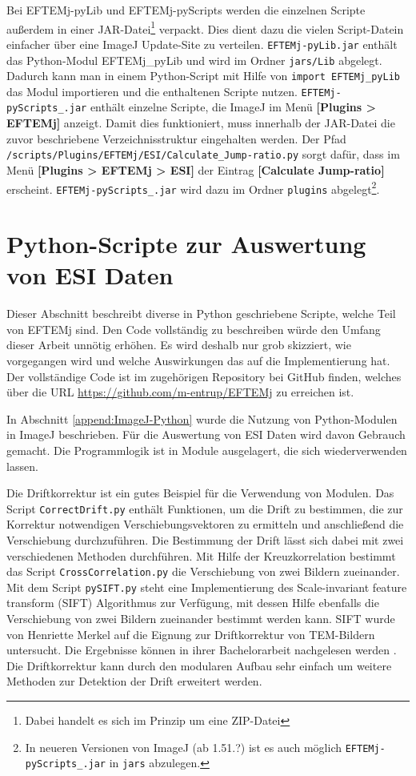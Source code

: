 \documentclass[
	paper=a4,				%
	twoside=true,			%
	BCOR=6mm,				%
	fontsize=12pt,			%
	pagesize=auto,			%
	numbers=noenddot,		%
	bibliography=totoc,		%
	draft=false
]{scrartcl}
\begin{document}
Bei EFTEMj-pyLib und EFTEMj-pyScripts werden die einzelnen Scripte außerdem in einer JAR-Datei\footnote{Dabei handelt es sich im Prinzip um eine ZIP-Datei} verpackt. Dies dient dazu die vielen Script-Datein einfacher über eine ImageJ Update-Site zu verteilen. \texttt{EFTEMj-pyLib.jar} enthält das Python-Modul EFTEMj\_pyLib und wird im Ordner \texttt{jars/Lib} abgelegt. Dadurch kann man in einem Python-Script mit Hilfe von \texttt{import EFTEMj\_pyLib} das Modul importieren und die enthaltenen Scripte nutzen. \texttt{EFTEMj-pyScripts\_.jar} enthält einzelne Scripte, die ImageJ im Menü \textbf{[Plugins > EFTEMj]} anzeigt. Damit dies funktioniert, muss innerhalb der JAR-Datei die zuvor beschriebene Verzeichnisstruktur eingehalten werden. Der Pfad \texttt{/scripts/Plugins/EFTEMj/ESI/Calculate\_Jump-ratio.py} sorgt dafür, dass im Menü \textbf{[Plugins > EFTEMj > ESI]} der Eintrag \textbf{[Calculate Jump-ratio]} erscheint. \texttt{EFTEMj-pyScripts\_.jar} wird dazu im Ordner \texttt{plugins} abgelegt\footnote{In neueren Versionen von ImageJ (ab 1.51.?) ist es auch möglich \texttt{EFTEMj-pyScripts\_.jar} in \texttt{jars} abzulegen.}.

\section{Python-Scripte zur Auswertung von ESI Daten} \label{append:ESI-Scripte}

Dieser Abschnitt beschreibt diverse in Python geschriebene Scripte, welche Teil von EFTEMj sind. Den Code vollständig zu beschreiben würde den Umfang dieser Arbeit unnötig erhöhen. Es wird deshalb nur grob skizziert, wie vorgegangen wird und welche Auswirkungen das auf die Implementierung hat. Der vollständige Code ist im zugehörigen Repository bei GitHub finden, welches über die URL \url{https://github.com/m-entrup/EFTEMj} zu erreichen ist.

In Abschnitt \ref{append:ImageJ-Python} wurde die Nutzung von Python-Modulen in ImageJ beschrieben. Für die Auswertung von ESI Daten wird davon Gebrauch gemacht. Die Programmlogik ist in Module ausgelagert, die sich wiederverwenden lassen.

Die Driftkorrektur ist ein gutes Beispiel für die Verwendung von Modulen. Das Script \texttt{CorrectDrift.py} enthält Funktionen, um die Drift zu bestimmen, die zur Korrektur notwendigen Verschiebungsvektoren zu ermitteln und anschließend die Verschiebung durchzuführen. Die Bestimmung der Drift lässt sich dabei mit zwei verschiedenen Methoden durchführen. Mit Hilfe der Kreuzkorrelation bestimmt das Script \texttt{CrossCorrelation.py} die Verschiebung von zwei Bildern zueinander. Mit dem Script \texttt{pySIFT.py} steht eine Implementierung des Scale-invariant feature transform (SIFT) Algorithmus zur Verfügung, mit dessen Hilfe ebenfalls die Verschiebung von zwei Bildern zueinander bestimmt werden kann. SIFT wurde von Henriette Merkel auf die Eignung zur Driftkorrektur von TEM-Bildern untersucht. Die Ergebnisse können in ihrer Bachelorarbeit nachgelesen werden \cite{merkel_merkmalsbasierte_2016}. Die Driftkorrektur kann durch den modularen Aufbau sehr einfach um weitere Methoden zur Detektion der Drift erweitert werden.
\end{document}
